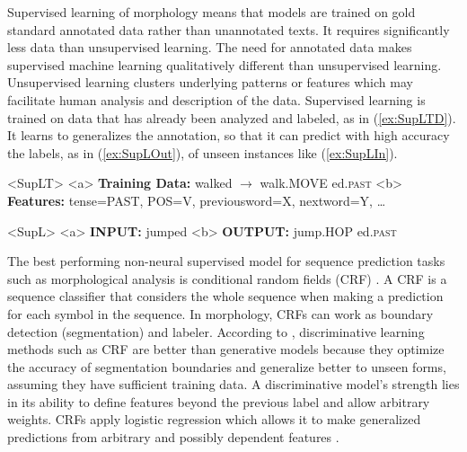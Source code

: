 \documentclass[12pt]{article}
\begin{document}
Supervised learning of morphology means that models are trained on gold standard annotated data rather than unannotated texts. It requires significantly less data than unsupervised learning. The need for annotated data makes supervised machine learning qualitatively different than unsupervised learning. Unsupervised learning clusters underlying patterns or features which may facilitate human analysis and description of the data. Supervised learning is trained on data that has already been analyzed and labeled, as in (\ref{ex:SupLTD}). It learns to generalizes the annotation, so that it can predict with high accuracy the labels, as in (\ref{ex:SupLOut}), of unseen instances like (\ref{ex:SupLIn}). 

\begin{singlespace}
\pex<SupLT>   
\label{ex:SupLT}
\a<a> \textbf{Training Data:} \hspace{2mm} walked \hspace{2mm} $\rightarrow$ \hspace{2mm} walk.MOVE \hspace{1mm} ed.\textsc{past}
\label{ex:SupLTD}
\a<b> \textbf{Features:}  tense=PAST, \hspace{1mm} POS=V, \hspace{1mm} previousword=X, \hspace{1mm} nextword=Y, \hspace{1mm} \dots 
\label{ex:SupLTFtrs}
\xe

\pex<SupL>   
\label{ex:SupLTrainIn}
\a<a> \textbf{INPUT:}  jumped 
\label{ex:SupLIn}
\a<b> \textbf{OUTPUT:} jump.HOP \hspace{1mm} ed.\textsc{past}
\label{ex:SupLOut}
\xe
\end{singlespace}

The best performing non-neural supervised model for sequence prediction tasks such as morphological analysis is conditional random fields (CRF) \cite{lafferty_conditional_2001,muller_efficient_2013,ruokolainen_comparative_2016}. A CRF is a sequence classifier that considers the whole sequence when making a prediction for each symbol in the sequence. In morphology, CRFs can work as boundary detection (segmentation) and labeler. According to , discriminative learning methods such as CRF are better than generative models because they optimize the accuracy of segmentation boundaries and generalize better to unseen forms, assuming they have sufficient training data. A discriminative model's strength lies in its ability to define features beyond the previous label and allow arbitrary weights. CRFs apply logistic regression which allows it to make generalized predictions from arbitrary and possibly dependent features \cite{ruokolainen_supervised_2013}. 
\end{document}
